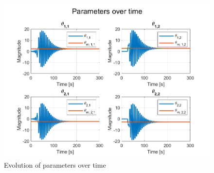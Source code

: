 \begin{figure}
    \centering
    \includegraphics[width=\linewidth]{images/sine/NMRAC_MIMO_Parameters.png}
    \caption{Evolution of parameters over time}
    \label{fig:parameters}
\end{figure}



